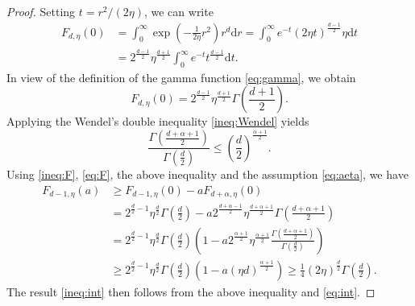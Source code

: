 \documentclass[10pt,a4paper]{amsart}
\newcommand{\nn}{\nonumber}
\newcommand{\rd}{\mathrm{d}}
\begin{document}
\begin{proof}
Setting $t=r^2/(2\eta)$, we can write
\begin{align}
    F_{d,\eta}(0) &=\int_0^\infty \exp\left( -\frac{1}{2\eta}r^2 \right) r^{d} \rd r
    =\int_0^\infty e^{-t} (2\eta t)^{\frac{d-1}2} \eta \rd t \nn \\
    &= 2^{\frac{d-1}2} \eta^{\frac{d+1}2} \int_0^\infty e^{-t}  t^{\frac{d-1}2} \rd t.
\end{align}
In view of the definition of the gamma function \eqref{eq:gamma}, we obtain
    \begin{equation}\label{eq:F}
        F_{d,\eta}(0) =2^{\frac{d-1}2} \eta^{\frac{d+1}2} \Gamma\left(\frac{d+1}{2}\right).
    \end{equation}
Applying the Wendel's double inequality \eqref{ineq:Wendel}
yields
\[
\frac{\Gamma\left(\frac{d+\alpha+1}{2} \right)}{\Gamma\left(\frac{d}{2} \right)} \le \left(\frac d2\right)^{\frac{\alpha+1}2}.
\]
Using \eqref{ineq:F}, \eqref{eq:F}, the above inequality and the assumption \eqref{eq:aeta}, we have
\begin{align*}
    F_{d-1,\eta}(a) &\ge F_{d-1,\eta}(0) - a F_{d+\alpha,\eta}(0) \\
    &= 2^{\frac d2-1} \eta^{\frac d2} \Gamma\left(\frac{d}{2}\right) - a 2^{\frac{d+\alpha-1}2} \eta^{\frac{d+\alpha+1}2} \Gamma\left(\frac{d+\alpha+1}{2}\right) \\
    &= 2^{\frac d2-1} \eta^{\frac d2} \Gamma\left(\frac{d}{2}\right) \left(1 - a 2^{\frac{\alpha+1}2} \eta^{\frac{\alpha+1}2} \frac{\Gamma\left(\frac{d+\alpha+1}{2} \right)}{\Gamma\left(\frac{d}{2} \right)} \right)\\
     &\ge 2^{\frac d2-1} \eta^{\frac d2} \Gamma\left(\frac{d}{2}\right) \left(1 - a (\eta d)^{\frac{\alpha+1}2} \right) \ge \frac14 (2\eta)^{\frac d2} \Gamma\left(\frac{d}{2}\right).
\end{align*}
The result \eqref{ineq:int} then follows from the above inequality and \eqref{eq:int}.
\end{proof}
\end{document}
